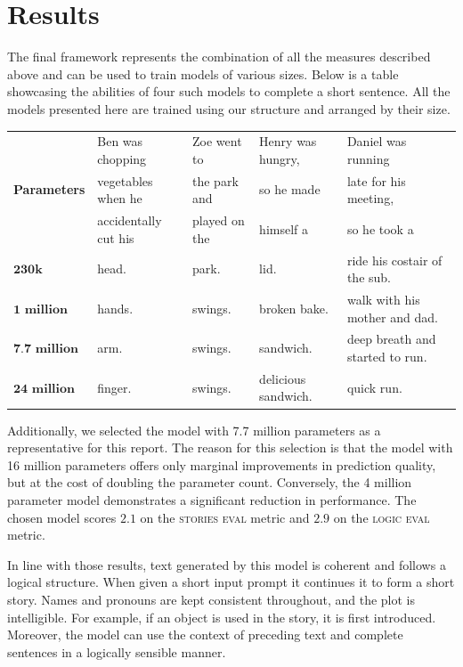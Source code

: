 \documentclass[11pt]{article}
\begin{document}
    \section{Results}
    The final framework represents the combination of all the measures described above and can be used to train models of various sizes.
    Below is a table showcasing the abilities of four such models to complete a short sentence. All the models presented here are trained using our structure and arranged by their size.

    \begin{tabular}{|l|l|l|l|l|}
    \hline
    & Ben was chopping & Zoe went to & Henry was hungry, & Daniel was running\\
    \textbf{Parameters} & vegetables when he & the park and & so he made & late for his meeting,\\
    &accidentally cut his & played on the & himself a & so he took a \\
    \hline
    $\textbf{230k}$ & head. & park. & lid. & ride his costair of the sub. \\
    \hline
    $\textbf{1 million}$ & hands. & swings. & broken bake. & walk with his mother and dad. \\
    \hline
    $\textbf{7.7 million}$ & arm. & swings. & sandwich. & deep breath and started to run. \\
    \hline
    $\textbf{24 million}$ & finger. & swings. & delicious sandwich. & quick run.\\
    \hline
    \end{tabular}


    Additionally, we selected the model with 7.7 million parameters as a representative for this report. The reason for this selection is that the model with 16 million parameters offers only marginal improvements in prediction quality, but at the cost of doubling the parameter count.
    Conversely, the 4 million parameter model demonstrates a significant reduction in performance.
    The chosen model scores $2.1$ on the \textsc{stories eval} metric and $2.9$ on the \textsc{logic eval} metric.

    In line with those results, text generated by this model is coherent and follows a logical structure.
    When given a short input prompt it continues it to form a short story. Names and pronouns are kept consistent throughout, and the plot is intelligible. For example, if an object is used in the story, it is first introduced.
    Moreover, the model can use the context of preceding text and complete sentences in a logically sensible manner.\\
\end{document}
